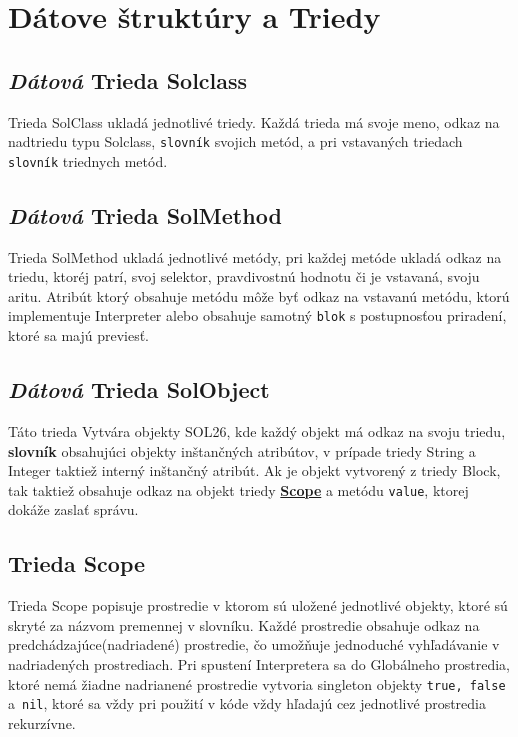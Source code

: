 \documentclass[a4paper, 11pt]{article}
\begin{document}
    \section{Dátove štruktúry a Triedy}

        \subsection{\textit{Dátová} Trieda Solclass}
        \label{solclass}
        Trieda SolClass ukladá jednotlivé triedy. 
        Každá trieda má svoje meno, odkaz na nadtriedu typu Solclass, \texttt{slovník} svojich metód, a pri vstavaných triedach \texttt{slovník} triednych metód.

        \subsection{\textit{Dátová} Trieda SolMethod}
        \label{solmethod}
        Trieda SolMethod ukladá jednotlivé metódy, pri každej metóde ukladá odkaz na triedu, ktoréj patrí, svoj selektor, pravdivostnú hodnotu či je vstavaná, svoju aritu.
        Atribút ktorý obsahuje metódu môže byť odkaz na vstavanú metódu, ktorú implementuje Interpreter alebo obsahuje samotný \texttt{blok} s postupnosťou priradení, ktoré sa majú previesť.

        \subsection{\textit{Dátová} Trieda SolObject}
        \label{solobject}
        Táto trieda Vytvára objekty SOL26, kde každý objekt má odkaz na svoju triedu, \textbf{slovník} obsahujúci objekty inštančných atribútov, v prípade triedy String a Integer taktiež interný inštančný atribút.
        Ak je objekt vytvorený z triedy Block, tak taktiež obsahuje odkaz na objekt triedy \hyperref[scope]{\textbf{Scope}} a metódu \texttt{value}, ktorej dokáže zaslať správu.

        \subsection{Trieda Scope}
        \label{scope}
        Trieda Scope popisuje prostredie v ktorom sú uložené jednotlivé objekty, ktoré sú skryté za názvom premennej v slovníku. 
        Každé prostredie obsahuje odkaz na predchádzajúce(nadriadené) prostredie, čo umožňuje jednoduché vyhľadávanie v nadriadených prostrediach.
        Pri spustení Interpretera sa do Globálneho prostredia, ktoré nemá žiadne nadrianené prostredie vytvoria singleton objekty \texttt{true, false} a~\texttt{nil}, ktoré sa vždy pri použití v kóde vždy hľadajú cez jednotlivé prostredia rekurzívne.
\end{document}
